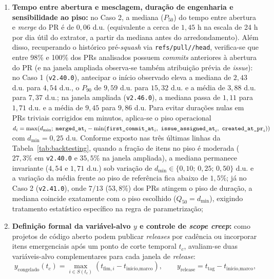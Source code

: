 \documentclass[12pt,openany,oneside,a4paper,english,brazilian,sumario=tradicional]{abntex2}
\begin{document}
\begin{enumerate}
  \item \textbf{Tempo entre abertura e mesclagem, duração de engenharia e sensibilidade ao piso:} no Caso 2, a mediana ($P_{50}$) do tempo entre abertura e \textit{merge} do PR é de $0{,}06$ d.u. (equivalente a cerca de $1{,}45$ h na escala de 24 h por dia útil do extrator, a partir da mediana antes do arredondamento). Além disso, recuperando o histórico pré-\textit{squash} via \texttt{refs/\allowbreak pull/\allowbreak */\allowbreak head}, verifica-se que entre 98\% e 100\% dos PRs analisados possuem \textit{commits} anteriores à abertura do PR (e na janela ampliada observa-se também atribuição prévia de \textit{issue}): no Caso 1 (\texttt{v2.40.0}), antecipar o início observado eleva a mediana de $2{,}43$ d.u. para $4{,}54$ d.u., o $P_{90}$ de $9{,}59$ d.u. para $15{,}32$ d.u. e a média de $3{,}88$ d.u. para $7{,}37$ d.u.; na janela ampliada (\texttt{v2.46.0}), a mediana passa de $1{,}11$ para $1{,}71$ d.u. e a média de $9{,}45$ para $9{,}86$ d.u. Para evitar durações nulas em PRs triviais corrigidos em minutos, aplica-se o piso operacional $d_i = \max(d_{\min};\; \texttt{merged\_\allowbreak at}_i - \allowbreak \min(\texttt{first\_\allowbreak commit\_\allowbreak at}_i,\allowbreak\ \texttt{issue\_\allowbreak assigned\_\allowbreak at}_i,\allowbreak\ \texttt{created\_\allowbreak at\_\allowbreak pr}_i))$ com $d_{\min}=0{,}25$ d.u. Conforme exposto nas três últimas linhas da Tabela~\ref{tab:backtesting}, quando a fração de itens no piso é moderada ($27{,}3\%$ em \texttt{v2.40.0} e $35{,}5\%$ na janela ampliada), a mediana permanece invariante ($4{,}54$ e $1{,}71$ d.u.) sob variação de $d_{\min} \in \{0{,}10;\,0{,}25;\,0{,}50\}$ d.u. e a variação da média frente ao piso de referência fica abaixo de $1{,}5\%$; já no Caso 2 (\texttt{v2.41.0}), onde $7/13$ ($53{,}8\%$) dos PRs atingem o piso de duração, a mediana coincide exatamente com o piso escolhido ($Q_{50} = d_{\min}$), exigindo tratamento estatístico específico na regra de parametrização;
  \item \textbf{Definição formal da variável-alvo $y$ e controle de \textit{scope creep}:} como projetos de código aberto podem publicar \textit{releases} por cadência ou incorporar itens emergenciais após um ponto de corte temporal $t_c$, avaliam-se duas variáveis-alvo complementares para cada janela de \textit{release}:
  \begin{equation}
  y_{\mathrm{congelado}}(t_c) = \max_{i \in S(t_c)} \left(t_{\mathrm{fim},i} - t_{\text{início,marco}}\right), \qquad y_{\mathrm{release}} = t_{\mathrm{tag}} - t_{\text{início,marco}},

\end{equation}
\end{enumerate}
\end{document}
